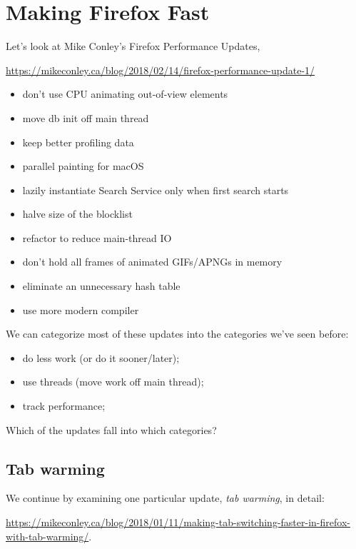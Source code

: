 \documentclass[a4paper]{report}
\begin{document}
\section*{Making Firefox Fast}

Let's look at Mike Conley's Firefox Performance Updates,
\begin{center}
{\scriptsize
\vspace*{-1em}
\url{https://mikeconley.ca/blog/2018/02/14/firefox-performance-update-1/}
}
\end{center}
\vspace*{-1em}

\begin{itemize}[noitemsep]
\item don't use CPU animating out-of-view elements
\item move db init off main thread
\item keep better profiling data
\item parallel painting for macOS
\item lazily instantiate Search Service only when first search starts
\item halve size of the blocklist
\item refactor to reduce main-thread IO
\item don't hold all frames of animated GIFs/APNGs in memory
\item eliminate an unnecessary hash table
\item use more modern compiler
\end{itemize}

We can categorize most of these updates into the categories we've seen before:
\begin{itemize}[noitemsep]
\item do less work (or do it sooner/later);
\item use threads (move work off main thread);
\item track performance;
\end{itemize}
Which of the updates fall into which categories?

\subsection*{Tab warming} We continue by examining one particular update, \emph{tab warming}, in detail:
\begin{center}
\scriptsize
\vspace*{-1em}
\url{https://mikeconley.ca/blog/2018/01/11/making-tab-switching-faster-in-firefox-with-tab-warming/}.
\end{center}
\vspace*{-1em}
\end{document}
